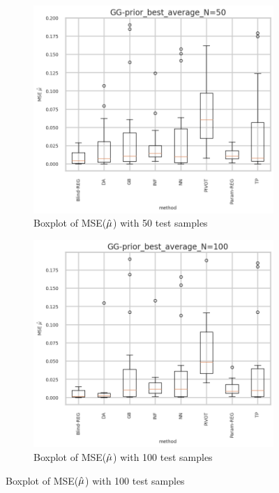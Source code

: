 \begin{figure}[ht!]
  \centering
  \begin{subfigure}[t]{0.49\linewidth}
    \includegraphics[width=\linewidth]{COMPARE/GG-prior/BEST_MSE/GG-prior_best_average_N=50-boxplot_mse.png}
    \caption{Boxplot of MSE($\hat\mu$) with 50 test samples}
  \end{subfigure}%
  \hfill
  \begin{subfigure}[t]{0.49\linewidth}
    \includegraphics[width=\linewidth]{COMPARE/GG-prior/BEST_MSE/GG-prior_best_average_N=100-boxplot_mse.png}
    \caption{Boxplot of MSE($\hat\mu$) with 100 test samples}
  \end{subfigure}


\end{figure}
